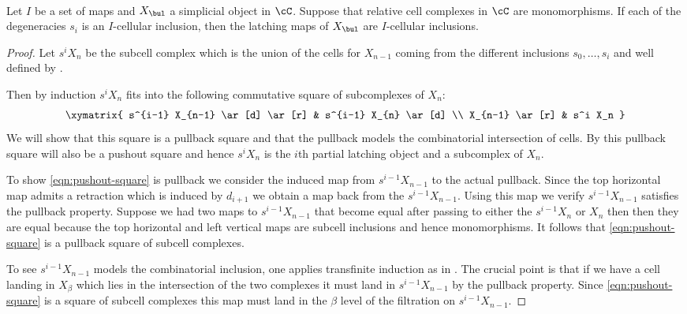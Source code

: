 \documentclass[leqno,oneside,english]{elsarticle}
\newcounter{enumisaved}
\newlength{\thmsaved}
\begin{document}
{{    {}  \ifshowcomplete
  \ 
  {
{{\ifshowsaveblocks
{}
\fi}}{}
\begin{lem*}
  \label{lem:partial-latching-subcell-inclusions}
  Let $I$ be a set of maps and $X_\bul$ a simplicial object in
  $\cC$.  Suppose that relative cell complexes in $\cC$ are
  monomorphisms. If each of the degeneracies $s_i$ is an $I$-cellular
  inclusion, then the latching maps of $X_\bul$ are $I$-cellular
  inclusions.
\end{lem*}
\begin{proof}
  Let $s^i X_n$ be the subcell complex which is the union of the cells
  for $X_{n-1}$ coming from the different inclusions $s_0,\ldots,s_i$
  and well defined by \cite[Prop.~10.6.10]{Hir03}. 

  Then by induction $s^i X_n$ fits into the following commutative square of
  subcomplexes of $X_n$:
  \begin{equation*}\label{eqn:pushout-square}\xymatrix{
    s^{i-1} X_{n-1} \ar[d] \ar[r] & s^{i-1} X_{n} \ar[d] \\
    X_{n-1} \ar[r] & s^i X_n
  }\end{equation*}
   We will show that this square is a pullback square and that the
   pullback models the combinatorial intersection of cells. By
   \cite[Prop.~12.2.3]{Hir03} this pullback square will also be a pushout
   square and hence $s^i X_n$ is the $i$th partial latching object and a
   subcomplex of $X_n$.

 To show \eqref{eqn:pushout-square} is pullback we consider the
 induced map from $s^{i-1}X_{n-1}$ to the actual pullback. Since the
 top horizontal map admits a retraction which is induced by $d_{i+1}$
 we obtain a map back from the $s^{i-1}X_{n-1}$. Using this map we
 verify $s^{i-1}X_{n-1}$ satisfies the pullback property. Suppose we
 had two maps to $s^{i-1}X_{n-1}$ that become equal after passing to
 either the $s^{i-1}X_n$ or $X_n$ then then they are equal because the
 top horizontal and left vertical maps are subcell inclusions and
 hence monomorphisms. It follows that \eqref{eqn:pushout-square} is a
 pullback square of subcell complexes. 

 To see $s^{i-1}X_{n-1}$ models the combinatorial inclusion, one
 applies transfinite induction as in \cite[Prop.~10.6.11]{Hir03}. The
 crucial point is that if we have a cell landing in $X_\beta$ which
 lies in the intersection of the two complexes it must land in
 $s^{i-1}X_{n-1}$ by the pullback property. Since
 \eqref{eqn:pushout-square} is a square of subcell complexes this map
 must land in the $\beta$ level of the filtration on
 $s^{i-1}X_{n-1}$.


\end{proof}}}}
\end{document}
